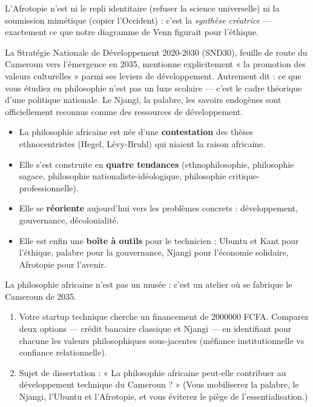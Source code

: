 \documentclass[11pt]{article}
\begin{document}
L'Afrotopie n'est ni le repli identitaire (refuser la science universelle) ni la soumission mimétique (copier l'Occident) : c'est la \emph{synthèse créatrice} — exactement ce que notre diagramme de Venn figurait pour l'éthique.

\begin{savaistu}
La Stratégie Nationale de Développement 2020-2030 (SND30), feuille de route du Cameroun vers l'émergence en 2035, mentionne explicitement « la promotion des valeurs culturelles » parmi ses leviers de développement. Autrement dit : ce que vous étudiez en philosophie n'est pas un luxe scolaire — c'est le cadre théorique d'une politique nationale. Le Njangi, la palabre, les savoirs endogènes sont officiellement reconnus comme des ressources de développement.
\end{savaistu}

\begin{aretenir}
\begin{itemize}
\item La philosophie africaine est née d'une \textbf{contestation} des thèses ethnocentristes (Hegel, Lévy-Bruhl) qui niaient la raison africaine.
\item Elle s'est construite en \textbf{quatre tendances} (ethnophilosophie, philosophie sagace, philosophie nationaliste-idéologique, philosophie critique-professionnelle).
\item Elle se \textbf{réoriente} aujourd'hui vers les problèmes concrets : développement, gouvernance, décolonialité.
\item Elle est enfin une \textbf{boîte à outils} pour le technicien : Ubuntu et Kant pour l'éthique, palabre pour la gouvernance, Njangi pour l'économie solidaire, Afrotopie pour l'avenir.
\end{itemize}
La philosophie africaine n'est pas un musée : c'est un atelier où se fabrique le Cameroun de 2035.
\end{aretenir}

\begin{exercice}
\begin{enumerate}
\item Votre startup technique cherche un financement de \num{2000000} FCFA. Comparez deux options — crédit bancaire classique et Njangi — en identifiant pour chacune les valeurs philosophiques sous-jacentes (méfiance institutionnelle vs confiance relationnelle).
\item Sujet de dissertation : « La philosophie africaine peut-elle contribuer au développement technique du Cameroun ? » (Vous mobiliserez la palabre, le Njangi, l'Ubuntu et l'Afrotopie, et vous éviterez le piège de l'essentialisation.)
\end{enumerate}
\end{exercice}
\end{document}
